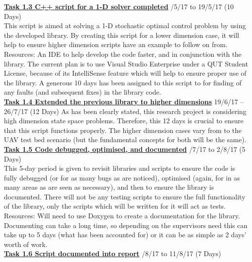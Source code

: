 \documentclass[11pt,draftd]{article}
\begin{document}
\begin{appendices}
		
	\noindent\underline{\textbf{Task 1.3 C++ script for a 1-D solver completed}} /5/17 to 19/5/17 (10 Days) \\
	
	\noindent This script is aimed at solving a 1-D stochastic optimal control problem by using the developed library. By creating this script for a lower dimension case, it will help to ensure higher dimension scripts have an example to follow on from. \\
	Resources: An IDE to help develop the code faster, and in conjunction with the library. The current plan is to use Visual Studio Enterprise under a QUT Student License, because of its IntelliSense feature which will help to ensure proper use of the library. A generous 10 days has been assigned to this script to for finding of any faults (and subsequent fixes) in the library code. \\
	
	\noindent\underline{\textbf{Task 1.4 Extended the previous library to higher dimensions}}
	19/6/17 – 26/7/17 (12 Days)
	\noindent As has been clearly stated, this research project is considering high dimension state space problems. Therefore, this 12 days is crucial to ensure that this script functions properly. The higher dimension cases vary from \cite{zylong} to the UAV test bed scenario (but the fundamental concepts for both will be the same).\\
	
	\noindent\underline{\textbf{Task 1.5 Code debugged, optimised, and documented}} /7/17 to 2/8/17 (5 Days) \\
	
	\noindent This 5-day period is given to revisit libraries and scripts to ensure the code is fully debugged (or for as many bugs as are noticed), optimised (again, for in as many areas as are seen as necessary), and then to ensure the library is documented. There will not be any testing scripts to ensure the full functionality of the library, only the scripts which will be written for it will act as tests. \\
	Resources: Will need to use Doxygen to create a documentation for the library. Documenting can take a long time, so depending on the supervisors need this can take up to 5 days (what has been accounted for) or it can be as simple as 2 days’ worth of work.\\
	
	\noindent\underline{\textbf{Task 1.6 Script documented into report}} /8/17 to 11/8/17 (7 Days) \\
	

\end{appendices}
\end{document}
